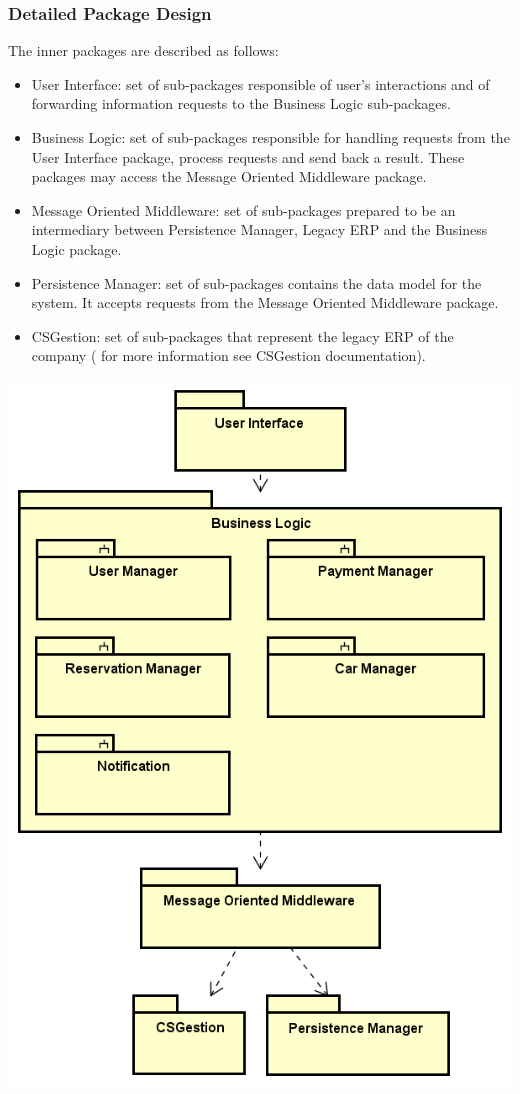 \documentclass{article}
\begin{document}
			\subsubsection{Detailed Package Design}
			The inner packages are described as follows:
			\begin{itemize}
				\item User Interface: set of sub-packages responsible of user's interactions and of forwarding information requests to the Business Logic sub-packages.
				\item Business Logic: set of sub-packages responsible for handling requests from the User Interface package, process requests and send back a result. These packages may access the Message Oriented Middleware package.
				\item Message Oriented Middleware: set of sub-packages prepared to be an intermediary between Persistence Manager, Legacy ERP and the Business Logic package.
				\item Persistence Manager: set of sub-packages contains the data model for the system. It accepts requests from the Message Oriented Middleware package.
				\item CSGestion:  set of sub-packages that represent the legacy ERP of the company (
				for more information see CSGestion documentation).
			\end{itemize}
			\begin{center}
				\includegraphics[width=0.8\linewidth]{"img/detailed-package-design"}
			\end{center}
			\pagebreak
\end{document}
